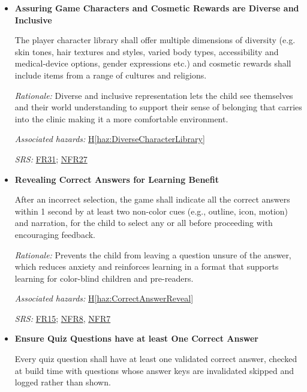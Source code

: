 \documentclass{article}
\newcounter{hazard}
\newcommand{\hazref}[1]{\hyperref[haz:#1]{H\ref*{haz:#1}}}
\newcounter{sr}
\newcommand{\srdef}[1]{\refstepcounter{sr}\label{sr:#1}\textbf{SR-\thesr:}}
\newcommand{\srsurl}{https://team-hindsight.github.io/ophthamology-game/SRS-IEEE/SRS.pdf}
\newcommand{\srsfrref}[2]{\href{\srsurl\#nameddest=#1}{FR#2}}
\newcommand{\srsnfrref}[2]{\href{\srsurl\#nameddest=#1}{NFR#2}}
\begin{document}
\begin{itemize}[leftmargin=1.5cm, labelwidth=1.3cm, labelsep=0.2cm,
  align=left, itemsep=1.2em, parsep=0.6em]
\textit{Associated hazards:}
\hazref{UnsafeAudioVisuals}

\textit{SRS:} \srsfrref{FR_NarrationFallback}{14}, \srsfrref{FR_Preferences}{40}; \srsnfrref{NFR_AudioSafety}{13}

\item[\srdef{CharacterDiversityInclusivity}]
\textbf{Assuring Game Characters and Cosmetic Rewards are Diverse and Inclusive}

The player character library shall offer multiple dimensions of 
diversity (e.g. skin tones, hair textures and styles, varied body types, 
accessibility and medical-device options, gender expressions etc.) and 
cosmetic rewards shall include items from a range of cultures and religions.

\textit{Rationale:}
Diverse and inclusive representation lets the child see themselves and their 
world understanding to support their sense of belonging that carries into the 
clinic making it a more comfortable environment.

\textit{Associated hazards:}
\hazref{DiverseCharacterLibrary}

\textit{SRS:} \srsfrref{FR_DiverseCharacters}{31}; \srsnfrref{NFR_Inclusivity}{27}

\item[\srdef{CorrectAnswerReveal}]
\textbf{Revealing Correct Answers for Learning Benefit}

After an incorrect selection, the game shall indicate all the correct answers
within 1 second by at least two non-color cues (e.g., outline, icon, motion) 
and narration, for the child to select any or all before proceeding with encouraging 
feedback.

\textit{Rationale:}
Prevents the child from leaving a question unsure of the answer, 
which reduces anxiety and reinforces learning in a format that supports 
learning for color-blind children and pre-readers.

\textit{Associated hazards:}
\hazref{CorrectAnswerReveal}

\textit{SRS:} \srsfrref{FR_RevealAnswer}{15}; \srsnfrref{NFR_Colour}{8}, \srsnfrref{NFR_Accessibility}{7}

\item[\srdef{AtLeastOneCorrectAnswer}]
\textbf{Ensure Quiz Questions have at least One Correct Answer}

Every quiz question shall have at least one validated correct answer, 
checked at build time with questions whose answer keys are invalidated 
skipped and logged rather than shown.


\end{itemize}
\end{document}

